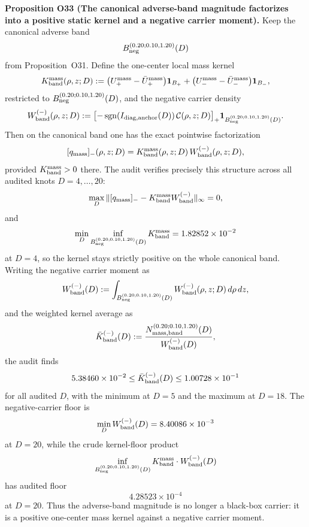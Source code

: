 \documentclass[aps,prd,onecolumn,notitlepage,nofootinbib,superscriptaddress,11pt,floatfix]{revtex4-2}
\begin{document}
\medskip\noindent\textbf{Proposition O33 (The canonical adverse-band magnitude factorizes into a positive static kernel and a negative carrier moment).}
Keep the canonical adverse band
\[
B_{\rm neg}^{(0.20;0.10,1.20)}(D)
\]
from Proposition~O31. Define the one-center local mass kernel
\[
K_{\rm band}^{\rm mass}(\rho,z;D)
:=
\bigl(U_+^{\rm mass}-\bar U_+^{\rm mass}\bigr)\mathbf 1_{B_+}
+
\bigl(U_-^{\rm mass}-\bar U_-^{\rm mass}\bigr)\mathbf 1_{B_-},
\]
restricted to \(B_{\rm neg}^{(0.20;0.10,1.20)}(D)\), and the negative carrier density
\[
W_{\rm band}^{(-)}(\rho,z;D)
:=
\bigl[-\operatorname{sgn}(I_{\rm diag,anchor}(D))\,\mathcal C(\rho,z;D)\bigr]_+
\mathbf 1_{B_{\rm neg}^{(0.20;0.10,1.20)}(D)}.
\]
Then on the canonical band one has the exact pointwise factorization
\[
[q_{\rm mass}]_-(\rho,z;D)
=
K_{\rm band}^{\rm mass}(\rho,z;D)\,W_{\rm band}^{(-)}(\rho,z;D),
\]
provided \(K_{\rm band}^{\rm mass}>0\) there. The audit
verifies precisely this structure across all audited knots \(D=4,\dots,20\):
\[
\max_D \|[q_{\rm mass}]_- - K_{\rm band}^{\rm mass}W_{\rm band}^{(-)}\|_\infty = 0,
\]
and
\[
\min_D \inf_{B_{\rm neg}^{(0.20;0.10,1.20)}(D)} K_{\rm band}^{\rm mass}
=
1.82852\times10^{-2}
\]
at \(D=4\), so the kernel stays strictly positive on the whole canonical band. Writing the negative carrier moment as
\[
W_{\rm band}^{(-)}(D)
:=
\int_{B_{\rm neg}^{(0.20;0.10,1.20)}(D)}
W_{\rm band}^{(-)}(\rho,z;D)\,d\rho\,dz,
\]
and the weighted kernel average as
\[
\bar K_{\rm band}^{(-)}(D)
:=
\frac{N_{\rm mass,band}^{(0.20;0.10,1.20)}(D)}
{W_{\rm band}^{(-)}(D)},
\]
the audit finds
\[
5.38460\times10^{-2}
\le
\bar K_{\rm band}^{(-)}(D)
\le
1.00728\times10^{-1}
\]
for all audited \(D\), with the minimum at \(D=5\) and the maximum at \(D=18\). The negative-carrier floor is
\[
\min_D W_{\rm band}^{(-)}(D)
=
8.40086\times10^{-3}
\]
at \(D=20\), while the crude kernel-floor product
\[
\inf_{B_{\rm neg}^{(0.20;0.10,1.20)}(D)}K_{\rm band}^{\rm mass}\cdot W_{\rm band}^{(-)}(D)
\]
has audited floor
\[
4.28523\times10^{-4}
\]
at \(D=20\). Thus the adverse-band magnitude is no longer a black-box carrier: it is a positive one-center mass kernel against a negative carrier moment.
\end{document}
